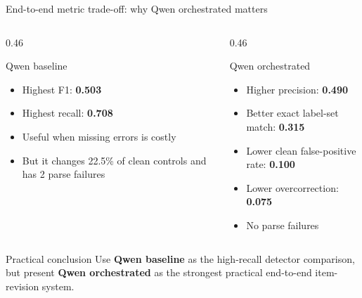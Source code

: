 \documentclass[aspectratio=169,10pt]{beamer}
\newcommand{\good}[1]{\textcolor{SeminarGreen}{\textbf{#1}}}
\newcommand{\tight}{\setlength{\itemsep}{2pt}\setlength{\parskip}{0pt}}
\begin{document}
\begin{frame}{End-to-end metric trade-off: why Qwen orchestrated matters}
\begin{columns}[T,onlytextwidth]
\begin{column}{0.46\textwidth}
\begin{block}{Qwen baseline}
\begin{itemize}\tight
  \item Highest F1: \good{0.503}
  \item Highest recall: \good{0.708}
  \item Useful when missing errors is costly
  \item But it changes 22.5\% of clean controls and has 2 parse failures
\end{itemize}
\end{block}
\end{column}
\begin{column}{0.46\textwidth}
\begin{block}{Qwen orchestrated}
\begin{itemize}\tight
  \item Higher precision: \good{0.490}
  \item Better exact label-set match: \good{0.315}
  \item Lower clean false-positive rate: \good{0.100}
  \item Lower overcorrection: \good{0.075}
  \item No parse failures
\end{itemize}
\end{block}
\end{column}
\end{columns}

\vspace{4mm}
\begin{alertblock}{Practical conclusion}
Use \textbf{Qwen baseline} as the high-recall detector comparison, but present \textbf{Qwen orchestrated} as the strongest practical end-to-end item-revision system.
\end{alertblock}
\end{frame}
\end{document}
